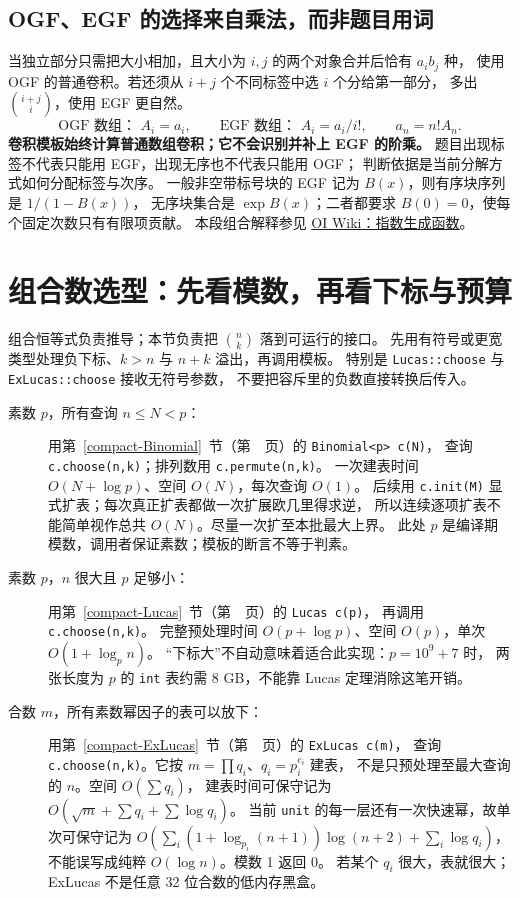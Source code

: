 \subsection{OGF、EGF 的选择来自乘法，而非题目用词}
当独立部分只需把大小相加，且大小为 $i,j$ 的两个对象合并后恰有 $a_i b_j$ 种，
使用 OGF 的普通卷积。若还须从 $i+j$ 个不同标签中选 $i$ 个分给第一部分，
多出 $\binom{i+j}{i}$，使用 EGF 更自然。
\[
\text{OGF 数组： }A_i=a_i,\qquad
\text{EGF 数组： }A_i=a_i/i!,\qquad a_n=n!A_n.
\]
\textbf{卷积模板始终计算普通数组卷积；它不会识别并补上 EGF 的阶乘。}
题目出现标签不代表只能用 EGF，出现无序也不代表只能用 OGF；
判断依据是当前分解方式如何分配标签与次序。
一般非空带标号块的 EGF 记为 $B(x)$，则有序块序列是 $1/(1-B(x))$，
无序块集合是 $\exp B(x)$；二者都要求 $B(0)=0$，使每个固定次数只有有限项贡献。
本段组合解释参见 \href{https://next.oi-wiki.org/math/poly/egf/}{OI Wiki：指数生成函数}。

\section{组合数选型：先看模数，再看下标与预算}\label{knowledge-binomial-choice}
组合恒等式负责推导；本节负责把 $\binom nk$ 落到可运行的接口。
先用有符号或更宽类型处理负下标、$k>n$ 与 $n+k$ 溢出，再调用模板。
特别是 \texttt{Lucas::choose} 与 \texttt{ExLucas::choose} 接收无符号参数，
不要把容斥里的负数直接转换后传入。

\begin{description}
\item[素数 $p$，所有查询 $n\le N<p$：]
用第~\ref{compact-Binomial}~节（第~\pageref{compact-Binomial}~页）的 \texttt{Binomial<p> c(N)}，
查询 \texttt{c.choose(n,k)}；排列数用 \texttt{c.permute(n,k)}。
一次建表时间 $O(N+\log p)$、空间 $O(N)$，每次查询 $O(1)$。
后续用 \texttt{c.init(M)} 显式扩表；每次真正扩表都做一次扩展欧几里得求逆，
所以连续逐项扩表不能简单视作总共 $O(N)$。尽量一次扩至本批最大上界。
此处 $p$ 是编译期模数，调用者保证素数；模板的断言不等于判素。
\item[素数 $p$，$n$ 很大且 $p$ 足够小：]
用第~\ref{compact-Lucas}~节（第~\pageref{compact-Lucas}~页）的 \texttt{Lucas c(p)}，
再调用 \texttt{c.choose(n,k)}。
完整预处理时间 $O(p+\log p)$、空间 $O(p)$，单次 $O(1+\log_p n)$。
“下标大”不自动意味着适合此实现：$p=10^9+7$ 时，
两张长度为 $p$ 的 \texttt{int} 表约需 8 GB，不能靠 Lucas 定理消除这笔开销。
\item[合数 $m$，所有素数幂因子的表可以放下：]
用第~\ref{compact-ExLucas}~节（第~\pageref{compact-ExLucas}~页）的 \texttt{ExLucas c(m)}，
查询 \texttt{c.choose(n,k)}。它按 $m=\prod q_i$、$q_i=p_i^{e_i}$ 建表，
不是只预处理至最大查询的 $n$。空间 $O(\sum q_i)$，
建表时间可保守记为 $O(\sqrt m+\sum q_i+\sum\log q_i)$。
当前 \texttt{unit} 的每一层还有一次快速幂，故单次可保守记为
$O(\sum_i(1+\log_{p_i}(n+1))\log(n+2)+\sum_i\log q_i)$，
不能误写成纯粹 $O(\log n)$。模数 1 返回 0。
若某个 $q_i$ 很大，表就很大；ExLucas 不是任意 32 位合数的低内存黑盒。
\end{description}

